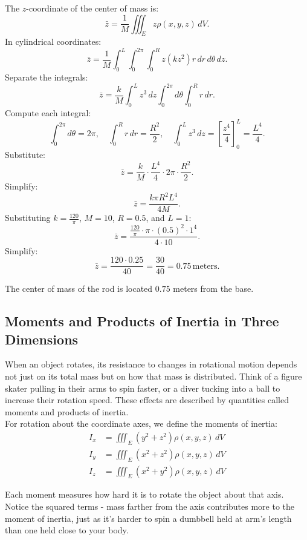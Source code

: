 \begin{example}
\begin{solution}
\begin{enumerate}
    The $z$-coordinate of the center of mass is:
    \[
    \bar{z} = \frac{1}{M} \iiint_E z \rho(x,y,z)\,dV.
    \]
    In cylindrical coordinates:
    \[
    \bar{z} = \frac{1}{M} \int_0^L \int_0^{2\pi} \int_0^R z (k z^2) r \,dr\,d\theta\,dz.
    \]
    Separate the integrals:
    \[
    \bar{z} = \frac{k}{M} \int_0^L z^3\,dz \int_0^{2\pi} d\theta \int_0^R r\,dr.
    \]
    Compute each integral:
    \[
    \int_0^{2\pi} d\theta = 2\pi, \quad \int_0^R r\,dr = \frac{R^2}{2}, \quad \int_0^L z^3\,dz = \left[\frac{z^4}{4}\right]_0^L = \frac{L^4}{4}.
    \]
    Substitute:
    \[
    \bar{z} = \frac{k}{M} \cdot \frac{L^4}{4} \cdot 2\pi \cdot \frac{R^2}{2}.
    \]
    Simplify:
    \[
    \bar{z} = \frac{k \pi R^2 L^4}{4M}.
    \]
    Substituting $k = \frac{120}{\pi}$, $M = 10$, $R = 0.5$, and $L = 1$:
    \[
    \bar{z} = \frac{\frac{120}{\pi} \cdot \pi \cdot (0.5)^2 \cdot 1^4}{4 \cdot 10}.
    \]
    Simplify:
    \[
    \bar{z} = \frac{120 \cdot 0.25}{40} = \frac{30}{40} = 0.75 \, \text{meters}.
    \]

    \noindent The center of mass of the rod is located $0.75$ meters from the base.
\end{enumerate}
\end{solution}
\end{example}
\exampleline


\subsection*{Moments and Products of Inertia in Three Dimensions}  

\noindent When an object rotates, its resistance to changes in rotational motion depends not just on its total mass but on how that mass is distributed. Think of a figure skater pulling in their arms to spin faster, or a diver tucking into a ball to increase their rotation speed. These effects are described by quantities called moments and products of inertia. \\

\noindent For rotation about the coordinate axes, we define the moments of inertia:
\begin{align*}
I_x &= \iiint_E (y^2 + z^2)\rho(x,y,z)\,dV \\
I_y &= \iiint_E (x^2 + z^2)\rho(x,y,z)\,dV \\
I_z &= \iiint_E (x^2 + y^2)\rho(x,y,z)\,dV
\end{align*}

\noindent Each moment measures how hard it is to rotate the object about that axis. Notice the squared terms - mass farther from the axis contributes more to the moment of inertia, just as it's harder to spin a dumbbell held at arm's length than one held close to your body. \\

